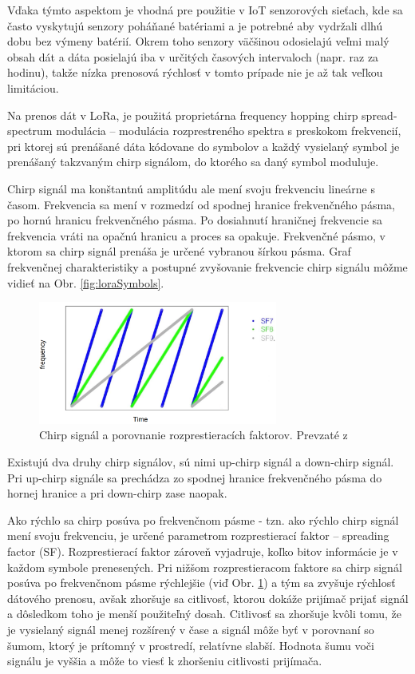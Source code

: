 \documentclass[slovak,master]{diploma}
\begin{document}
Vďaka týmto aspektom je vhodná pre použitie v IoT senzorových sieťach, kde sa často vyskytujú senzory poháňané batériami a je potrebné aby vydržali dlhú dobu 
bez výmeny batérií. Okrem toho senzory väčšinou odosielajú veľmi malý obsah dát a dáta posielajú iba v určitých časových intervaloch (napr. raz za hodinu), 
takže nízka prenosová rýchlosť v tomto prípade nie je až tak veľkou limitáciou.

Na prenos dát v LoRa, je použitá proprietárna frequency hopping chirp spread-spectrum modulácia -- modulácia rozprestreného spektra s preskokom frekvencií, pri ktorej sú prenášané dáta kódovane do symbolov 
a každý vysielaný symbol je prenášaný takzvaným chirp signálom, do ktorého sa daný symbol moduluje.

Chirp signál ma konštantnú amplitúdu ale mení svoju frekvenciu lineárne s časom. 
Frekvencia sa mení v rozmedzí od spodnej hranice frekvenčného pásma, po hornú hranicu frekvenčného pásma.
Po dosiahnutí hraničnej frekvencie sa frekvencia vráti na opačnú hranicu a proces sa opakuje.
Frekvenčné pásmo, v ktorom sa chirp signál prenáša je určené vybranou šírkou pásma.
Graf frekvenčnej charakteristiky a postupné zvyšovanie frekvencie chirp signálu môžme vidieť na Obr. \ref{fig:loraSymbols}.
\begin{figure}
	\centering
	\includegraphics[width=0.7\textwidth]{Figures/spreading factors.png}
	\caption{Chirp signál a porovnanie rozprestieracích faktorov. Prevzaté z \cite{spreadfactorimage}}
	\label{fig:spreadingfactors}
\end{figure}

Existujú dva druhy chirp signálov, sú nimi up-chirp signál a down-chirp signál. Pri up-chirp signále sa prechádza zo spodnej hranice frekvenčného pásma do hornej hranice a pri 
down-chirp zase naopak.

\newpage
Ako rýchlo sa chirp posúva po frekvenčnom pásme - tzn. ako rýchlo chirp signál mení svoju frekvenciu, je určené parametrom rozprestierací faktor -- spreading factor (SF). 
Rozprestierací faktor zároveň vyjadruje, koľko bitov informácie je v každom symbole prenesených. Pri nižšom rozprestieracom faktore sa chirp signál posúva po 
frekvenčnom pásme rýchlejšie (viď Obr. \ref{fig:spreadingfactors}) a tým sa zvyšuje rýchlosť dátového prenosu, 
avšak zhoršuje sa citlivosť, ktorou dokáže prijímač prijať signál a dôsledkom toho je menší použiteľný dosah. Citlivosť sa zhoršuje kvôli 
tomu, že je vysielaný signál menej rozšírený v čase a signál môže byť v porovnaní so šumom, ktorý je prítomný v prostredí, relatívne slabší. 
Hodnota šumu voči signálu je vyššia a môže to viesť k zhoršeniu citlivosti prijímača.
\end{document}
